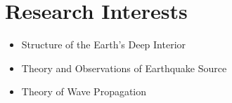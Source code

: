 \section{Research Interests}

\begin{itemize}
\item Structure of the Earth's Deep Interior
\item Theory and Observations of Earthquake Source
\item Theory of Wave Propagation
\end{itemize}
